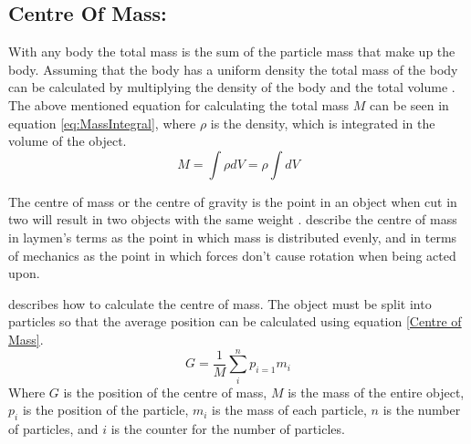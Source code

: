 \subsection{Centre Of Mass:}\label{sc:COM}
With any body the total mass is the sum of the particle mass that make up the body.
Assuming that the body has a uniform density the total mass of the body can be calculated by multiplying the density of the body and the total volume \citep{bourg2013physics}.
The above mentioned equation for calculating the total mass $M$ can be seen in equation \ref{eq:MassIntegral}, where $\rho$ is the density, which is integrated in the volume of the object.
\begin{equation}\label{eq:MassIntegral}
	M = \int \rho dV = \rho \int dV
\end{equation}

The centre of mass or the centre of gravity is the point in an object when cut in two will result in two objects with the same weight \citep{millington2007game}. 
\cite{bourg2013physics} describe the centre of mass in laymen's terms as the point in which mass is distributed evenly, and in terms of mechanics as the point in which forces don't cause rotation when being acted upon. 

\citet{millington2007game} describes how to calculate the centre of mass.
The object must be split into particles so that the average position can be calculated using equation \ref{Centre of Mass}. 
\begin{equation}\label{Centre of Mass}
   G=\frac{1}{M}\displaystyle\sum_{i}^{n}{p}_{i=1}{m}_{i} 
\end{equation}
Where $G$ is the position of the centre of mass, $M$ is the mass of the entire object, ${p}_{i}$ is the position of the particle, ${m}_{i}$ is the mass of each particle, $n$ is the number of particles, and $i$ is the counter for the number of particles.

